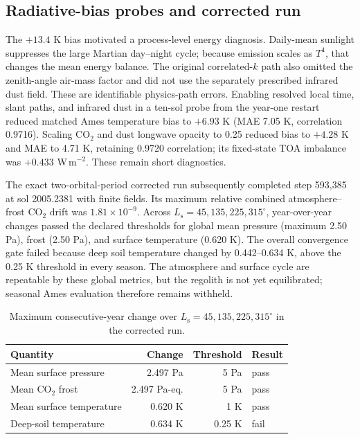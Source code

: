 \documentclass{article}
\newcommand{\Ls}{L_\mathrm{s}}
\begin{document}
\subsection{Radiative-bias probes and corrected run}
The \(+13.4\) K bias motivated a process-level energy diagnosis. Daily-mean
sunlight suppresses the large Martian day--night cycle; because emission scales
as \(T^4\), that changes the mean energy balance. The original correlated-\(k\)
path also omitted the zenith-angle air-mass factor and did not use the separately
prescribed infrared dust field. These are identifiable physics-path errors.
Enabling resolved local time, slant paths, and
infrared dust in a ten-sol probe from the year-one restart
reduced matched Ames temperature bias to \(+6.93\) K (MAE 7.05 K, correlation
0.9716). Scaling CO\(_2\) and dust longwave opacity to 0.25 reduced bias to
\(+4.28\) K and MAE to 4.71 K, retaining 0.9720 correlation; its fixed-state TOA
imbalance was \(+0.433\) W\,m\(^{-2}\). These remain short diagnostics.

The exact two-orbital-period corrected run subsequently completed step 593,385
at sol 2005.2381 with finite fields. Its maximum relative combined
atmosphere--frost \(\mathrm{CO_2}\) drift was \(1.81\times10^{-9}\). Across
\(\Ls=45,135,225,315^\circ\), year-over-year changes passed the declared
thresholds for global mean pressure (maximum 2.50 Pa), frost (2.50 Pa), and
surface temperature (0.620 K). The overall convergence gate failed because deep
soil temperature changed by 0.442--0.634 K, above the 0.25 K threshold in every
season. The atmosphere and surface cycle are repeatable by these global metrics,
but the regolith is not yet equilibrated; seasonal Ames evaluation therefore
remains withheld.

\begin{table}[t]\centering\small
\caption{Maximum consecutive-year change over
$\Ls=45,135,225,315^\circ$ in the corrected run.}\label{tab:convergence}
\begin{tabular}{lrrl}\toprule
Quantity & Change & Threshold & Result\\\midrule
Mean surface pressure & 2.497 Pa & 5 Pa & pass\\
Mean CO$_2$ frost & 2.497 Pa-eq. & 5 Pa & pass\\
Mean surface temperature & 0.620 K & 1 K & pass\\
Deep-soil temperature & 0.634 K & 0.25 K & fail\\\bottomrule
\end{tabular}
\end{table}
\end{document}
